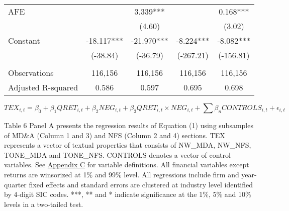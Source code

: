 \begin{table}[H]
\begin{center}
\begin{tabular}{lcccc}
			AFE &   & 3.339*** &   & 0.168*** \\
			&   & (4.60) &   & (3.02) \\
			Constant & -18.117*** & -21.970*** & -8.224*** & -8.082*** \\
			& (-38.84) & (-36.79) & (-267.21) & (-156.81) \\
			&   &   &   &  \\
			Observations & 116,156 & 116,156 & 116,156 & 116,156 \\
			Adjusted R-squared & 0.586 & 0.597 & 0.695 & 0.698 \\
			\bottomrule
			\bottomrule
		\end{tabular}%
	\end{center}
\begin{footnotesize}
	\setcounter{equation}{0}
	\begin{equation}
		TEX_{i,t}=\beta_0+\beta_1QRET_{i,t}+\beta_2NEG_{i,t}+\beta_3QRET_{i,t}\times NEG_{i,t}+\sum\beta_nCONTROLS_{i,t}+\epsilon_{i,t}
	\end{equation}
	
	\noindent Table 6 Panel A presents the regression results of Equation (1) using subsamples of MD\&A (Column 1 and 3) and NFS (Column 2 and 4) sections. TEX represents a vector of textual properties that consists of NW\_MDA, NW\_NFS, TONE\_MDA and TONE\_NFS. CONTROLS denotes a vector of control variables. See \hyperref[appc]{Appendix C} for variable definitions. All financial variables except returns are winsorized at 1\% and 99\% level. All regressions include firm and year-quarter fixed effects and standard errors are clustered at industry level identified by 4-digit SIC codes. ***, ** and * indicate significance at the 1\%, 5\% and 10\% levels in a two-tailed test.
\end{footnotesize}
\end{table}%